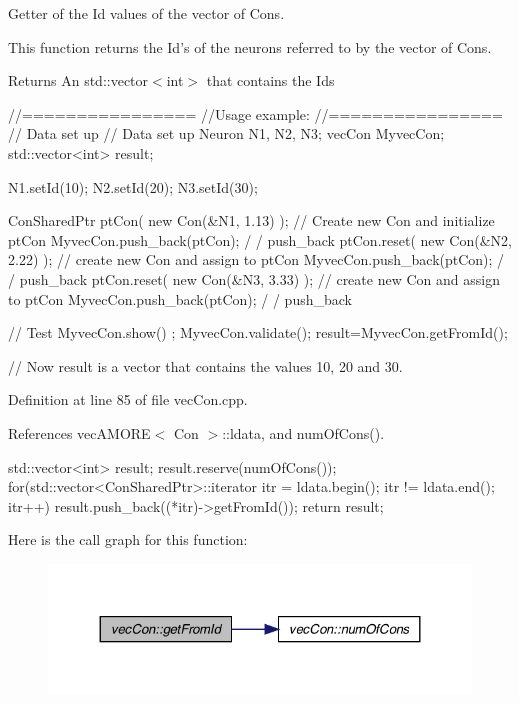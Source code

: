 Getter of the Id values of the vector of Cons. 

This function returns the Id's of the neurons referred to by the vector of Cons. \begin{DoxyReturn}{Returns}
An std::vector$<$int$>$ that contains the Ids
\end{DoxyReturn}

\begin{DoxyCode}
  //================
  //Usage example:
  //================
        // Data set up
        // Data set up
                        Neuron N1, N2, N3;
                        vecCon MyvecCon;
                        std::vector<int> result;

                        N1.setId(10);
                        N2.setId(20);
                        N3.setId(30);

                        ConSharedPtr ptCon( new Con(&N1, 1.13) );       // Create
       new Con and initialize ptCon
                        MyvecCon.push_back(ptCon);                              /
      / push_back
                        ptCon.reset(  new Con(&N2, 2.22) );             // create
       new Con and assign to ptCon
                        MyvecCon.push_back(ptCon);                              /
      / push_back
                        ptCon.reset(  new Con(&N3, 3.33) );             // create
       new Con and assign to ptCon
                        MyvecCon.push_back(ptCon);                              /
      / push_back

        // Test
                        MyvecCon.show() ;
                        MyvecCon.validate();
                        result=MyvecCon.getFromId();

        // Now result is a vector that contains the values 10, 20 and 30.
\end{DoxyCode}
 

Definition at line 85 of file vecCon.cpp.



References vecAMORE$<$ Con $>$::ldata, and numOfCons().


\begin{DoxyCode}
                                  {
        std::vector<int> result;
        result.reserve(numOfCons());
        for(std::vector<ConSharedPtr>::iterator itr = ldata.begin();   itr != 
      ldata.end();   itr++)   { result.push_back((*itr)->getFromId()); }
        return result;
}
\end{DoxyCode}


Here is the call graph for this function:\nopagebreak
\begin{figure}[H]
\begin{center}
\leavevmode
\includegraphics[width=324pt]{classvec_con_aa9f3f5df4c4060951c975c4c829b8471_cgraph}
\end{center}
\end{figure}


